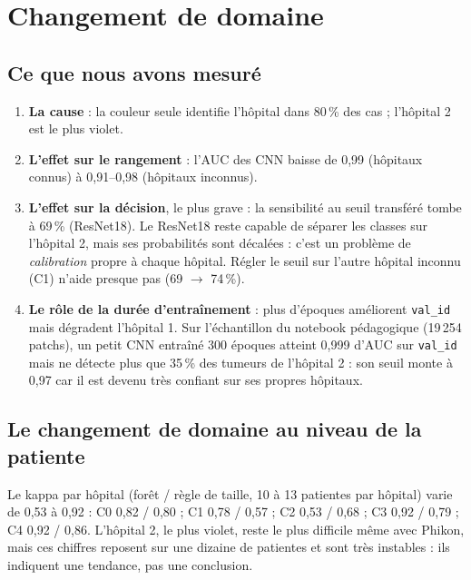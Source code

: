 \documentclass[11pt,a4paper]{article}
\begin{document}
\section{Changement de domaine}\label{sec:domaine}

\subsection{Ce que nous avons mesuré}
\begin{enumerate}
  \item \textbf{La cause} : la couleur seule identifie l'hôpital dans 80\,\% des cas ; l'hôpital 2 est le plus violet.
  \item \textbf{L'effet sur le rangement} : l'AUC des CNN baisse de 0,99 (hôpitaux connus) à 0,91–0,98 (hôpitaux inconnus).
  \item \textbf{L'effet sur la décision}, le plus grave : la sensibilité au seuil transféré tombe à 69\,\% (ResNet18). Le ResNet18
        reste capable de séparer les classes sur l'hôpital 2, mais ses probabilités sont décalées : c'est un problème de
        \emph{calibration} propre à chaque hôpital. Régler le seuil sur l'autre hôpital inconnu (C1) n'aide presque pas (69 $\to$ 74\,\%).
  \item \textbf{Le rôle de la durée d'entraînement} : plus d'époques améliorent \texttt{val\_id} mais dégradent l'hôpital 1. Sur
        l'échantillon du notebook pédagogique (19\,254 patchs), un petit CNN entraîné 300 époques atteint 0,999 d'AUC sur
        \texttt{val\_id} mais ne détecte plus que 35\,\% des tumeurs de l'hôpital 2 : son seuil monte à 0,97 car il est devenu
        très confiant sur ses propres hôpitaux.
\end{enumerate}

\subsection{Le changement de domaine au niveau de la patiente}
Le kappa par hôpital (forêt / règle de taille, 10 à 13 patientes par hôpital) varie de 0,53 à 0,92 : C0 0,82 / 0,80 ; C1 0,78 / 0,57 ;
C2 0,53 / 0,68 ; C3 0,92 / 0,79 ; C4 0,92 / 0,86. L'hôpital 2, le plus violet, reste le plus difficile même avec Phikon, mais ces
chiffres reposent sur une dizaine de patientes et sont très instables : ils indiquent une tendance, pas une conclusion.
\end{document}
